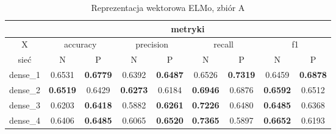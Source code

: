 \begin{table}[p]  \centering
    \caption{Reprezentacja wektorowa ELMo, zbiór A}
    \label{tab:wyniki_elmo_A}
    \begin{tabular}{|c|c|c|c|c|c|c|c|c|}    \hline
                 & \multicolumn{8}{c|}{metryki}                                                                                                                                                                                                                                                                                  \\ \hline
        X        & \multicolumn{2}{c|}{accuracy}       & \multicolumn{2}{c|}{precision}      & \multicolumn{2}{c|}{recall}         & \multicolumn{2}{c|}{f1}                                                                                                                                                                     \\ \hline
        sieć     & N                                   & P                                   & N                                   & P                                   & N                                   & P                                   & N                                   & P                                   \\ \hline
        dense\_1 & 0.6531                              & \textbf{0.6779}                     & 0.6392                              & \textbf{0.6487}                     & 0.6526                              & \textbf{0.7319}                     & 0.6459                              & \textbf{0.6878}                     \\ \hline
        dense\_2 & \textbf{0.6519}                     & 0.6429                              & \textbf{0.6273}                     & 0.6184                              & \textbf{0.6946}                     & 0.6876                              & \textbf{0.6592}                     & 0.6512                              \\ \hline
        dense\_3 & 0.6203                              & \textbf{0.6418}                     & 0.5882                              & \textbf{0.6261}                     & \textbf{0.7226}                     & 0.6480                              & \textbf{0.6485}                     & 0.6368                              \\ \hline
        dense\_4 & 0.6406                              & \textbf{0.6485}                     & 0.6065                              & \textbf{0.6520}                     & \textbf{0.7365}                     & 0.5897                              & \textbf{0.6652}                     & 0.6193                              \\ \hline

\end{tabular}
\end{table}
